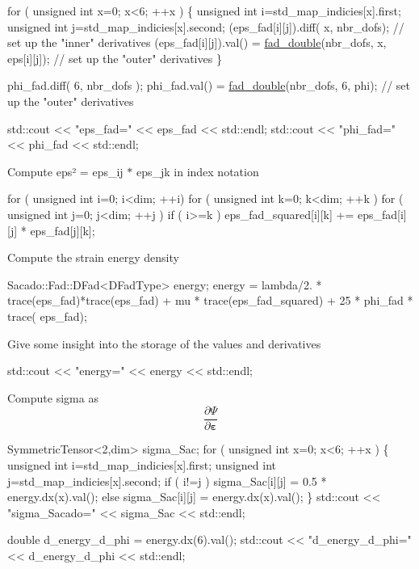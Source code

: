 \begin{DoxyCode}
\textcolor{keywordflow}{for} ( \textcolor{keywordtype}{unsigned} \textcolor{keywordtype}{int} x=0; x<6; ++x )
\{
   \textcolor{keywordtype}{unsigned} \textcolor{keywordtype}{int} i=std\_map\_indicies[x].first;
   \textcolor{keywordtype}{unsigned} \textcolor{keywordtype}{int} j=std\_map\_indicies[x].second;
   (eps\_fad[i][j]).diff( x, nbr\_dofs); \textcolor{comment}{// set up the "inner" derivatives}
   (eps\_fad[i][j]).val() = \hyperlink{Sacado__example_8cc_a868b94676739e612d9c95940e70892a9}{fad\_double}(nbr\_dofs, x, eps[i][j]); \textcolor{comment}{// set up the "outer" derivatives}
\}

phi\_fad.diff( 6, nbr\_dofs );
phi\_fad.val() = \hyperlink{Sacado__example_8cc_a868b94676739e612d9c95940e70892a9}{fad\_double}(nbr\_dofs, 6, phi); \textcolor{comment}{// set up the "outer" derivatives}

std::cout << \textcolor{stringliteral}{"eps\_fad="} << eps\_fad << std::endl;
std::cout << \textcolor{stringliteral}{"phi\_fad="} << phi\_fad << std::endl;
\end{DoxyCode}
 Compute eps² = eps\+\_\+ij $\ast$ eps\+\_\+jk in index notation 
\begin{DoxyCode}
\textcolor{keywordflow}{for} ( \textcolor{keywordtype}{unsigned} \textcolor{keywordtype}{int} i=0; i<dim; ++i)
   \textcolor{keywordflow}{for} ( \textcolor{keywordtype}{unsigned} \textcolor{keywordtype}{int} k=0; k<dim; ++k )
       \textcolor{keywordflow}{for} ( \textcolor{keywordtype}{unsigned} \textcolor{keywordtype}{int} j=0; j<dim; ++j )
           \textcolor{keywordflow}{if} ( i>=k )
               eps\_fad\_squared[i][k] += eps\_fad[i][j] * eps\_fad[j][k];
\end{DoxyCode}
 Compute the strain energy density 
\begin{DoxyCode}
Sacado::Fad::DFad<DFadType> energy;
energy = lambda/2. * trace(eps\_fad)*trace(eps\_fad) + mu * trace(eps\_fad\_squared) + 25 * phi\_fad * trace(
      eps\_fad);
\end{DoxyCode}
 Give some insight into the storage of the values and derivatives 
\begin{DoxyCode}
std::cout << \textcolor{stringliteral}{"energy="} << energy << std::endl;
\end{DoxyCode}
 Compute sigma as \[ \frac{\partial \Psi}{\partial \boldsymbol{\varepsilon}} \] 
\begin{DoxyCode}
SymmetricTensor<2,dim> sigma\_Sac;
\textcolor{keywordflow}{for} ( \textcolor{keywordtype}{unsigned} \textcolor{keywordtype}{int} x=0; x<6; ++x )
\{
   \textcolor{keywordtype}{unsigned} \textcolor{keywordtype}{int} i=std\_map\_indicies[x].first;
   \textcolor{keywordtype}{unsigned} \textcolor{keywordtype}{int} j=std\_map\_indicies[x].second;
   \textcolor{keywordflow}{if} ( i!=j )
       sigma\_Sac[i][j] = 0.5 * energy.dx(x).val();
   \textcolor{keywordflow}{else}
       sigma\_Sac[i][j] = energy.dx(x).val();
\}
std::cout << \textcolor{stringliteral}{"sigma\_Sacado="} << sigma\_Sac << std::endl;

\textcolor{keywordtype}{double} d\_energy\_d\_phi = energy.dx(6).val();
std::cout << \textcolor{stringliteral}{"d\_energy\_d\_phi="} << d\_energy\_d\_phi << std::endl;
\end{DoxyCode}
